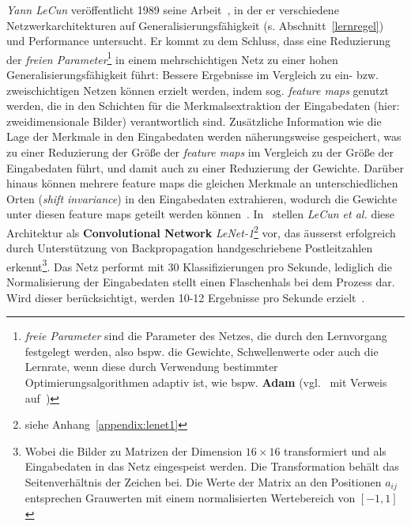 \textit{Yann LeCun} veröffentlicht 1989 seine Arbeit~\cite{Cun89}, in der er verschiedene Netzwerkarchitekturen auf Generalisierungsfähigkeit (s. Abschnitt~\ref{lernregel}) und Performance untersucht. Er kommt zu dem Schluss, dass eine Reduzierung der \textit{freien Parameter}\footnote{
    \textit{freie Parameter} sind die Parameter des Netzes, die durch den Lernvorgang festgelegt werden, also bspw. die Gewichte, Schwellenwerte oder auch die Lernrate, wenn diese durch Verwendung bestimmter Optimierungsalgorithmen adaptiv ist, wie bspw. \textbf{Adam} (vgl.~\cite[346]{GBC18} mit Verweis auf~\cite{KB17})
} in einem mehrschichtigen Netz zu einer hohen Generalisierungsfähigkeit führt: Bessere Ergebnisse im Vergleich zu  ein- bzw. zweischichtigen Netzen können erzielt werden, indem sog. \textit{feature maps} genutzt werden, die in den Schichten für die Merkmalsextraktion der Eingabedaten (hier: zweidimensionale Bilder) verantwortlich sind.
Zusätzliche Information wie die Lage der Merkmale in den Eingabedaten werden näherungsweise gespeichert, was zu einer Reduzierung der Größe der \textit{feature maps} im Vergleich zu der Größe der Eingabedaten führt, und damit auch zu einer Reduzierung der Gewichte.
Darüber hinaus können mehrere feature maps die gleichen Merkmale an unterschiedlichen Orten (\textit{shift invariance}) in den Eingabedaten extrahieren, wodurch die Gewichte unter diesen feature maps geteilt werden können~\cite[151 f.]{Cun89}.
In~\cite{CBD+89} stellen \textit{LeCun et al.} diese Architektur als \textbf{Convolutional Network} \textit{LeNet-1}\footnote{
    siehe Anhang~\ref{appendix:lenet1}
}  vor\cite[13]{CBBH98}, das äusserst erfolgreich durch Unterstützung von Backpropagation  handgeschriebene Postleitzahlen erkennt\footnote{
    Wobei die Bilder zu Matrizen der Dimension $16 \times 16$ transformiert und als Eingabedaten in das Netz eingespeist werden. Die Transformation behält das Seitenverhältnis der Zeichen bei. Die Werte der Matrix an den Positionen $a_{ij}$ entsprechen Grauwerten mit einem normalisierten Wertebereich von $[-1, 1]$\cite[542]{CBD+89}
}. Das Netz performt mit 30 Klassifizierungen pro Sekunde, lediglich die Normalisierung der Eingabedaten stellt einen Flaschenhals bei dem Prozess dar. Wird dieser berücksichtigt, werden 10-12 Ergebnisse pro Sekunde erzielt~\cite[549]{CBD+89}.\\



